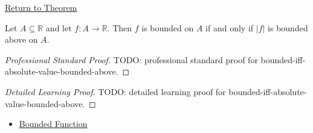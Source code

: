 \newpage
{}
\label{prf:bounded-iff-absolute-value-bounded-above}

\begin{remark*}[Return]
\hyperref[thm:bounded-iff-absolute-value-bounded-above]{Return to Theorem}
\end{remark*}

\begin{theorem*}
Let \(A\subseteq\mathbb{R}\) and let \(f:A\to\mathbb{R}\).  Then \(f\) is
bounded on \(A\) if and only if \(|f|\) is bounded above on \(A\).
\end{theorem*}

\begin{proof}[Professional Standard Proof]
\LRAProofBodyStart
TODO: professional standard proof for bounded-iff-absolute-value-bounded-above.
\end{proof}

\begin{proof}[Detailed Learning Proof]
\LRAProofBodyStart
TODO: detailed learning proof for bounded-iff-absolute-value-bounded-above.
\end{proof}

\begin{remark*}
\end{remark*}

\begin{dependencies}
\begin{itemize}
  \item \hyperref[def:function-bounded]{Bounded Function}
\end{itemize}
\end{dependencies}

\clearpage
